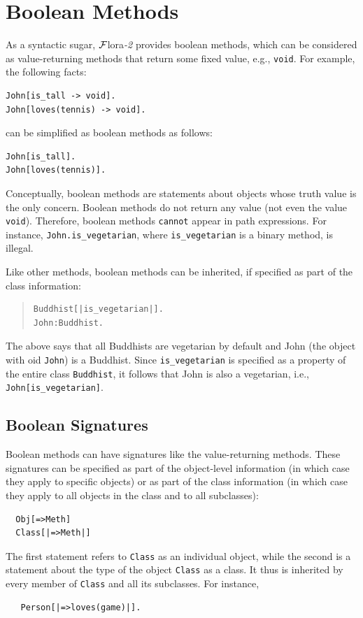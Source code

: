 \documentclass[11pt]{article}
\newcommand{\FLSYSTEM}{{\mbox{\sc ${\cal F}${lora}\rm\emph{-2}}}\xspace}
\begin{document}
\section{Boolean Methods}


As a syntactic sugar, \FLSYSTEM provides boolean methods, which can be
considered as value-returning methods that return some fixed value, e.g.,
{\tt void}. For example, the following facts:
\begin{verbatim}
John[is_tall -> void].
John[loves(tennis) -> void].
\end{verbatim}
can be simplified as boolean methods as follows:
\begin{verbatim}
John[is_tall].
John[loves(tennis)].
\end{verbatim}

Conceptually, boolean methods are statements about objects whose truth
value is the only concern. Boolean methods do not return any value (not
even the value {\tt void}). Therefore, boolean methods {\tt cannot} appear
in path expressions. For instance, \mbox{\tt John.is\_vegetarian}, where
{\tt is\_vegetarian} is a binary method, is illegal.

Like other methods, boolean methods can be inherited, if specified as part
of the class information:
\begin{quote}
\begin{verbatim}
Buddhist[|is_vegetarian|].
John:Buddhist.
\end{verbatim}
\end{quote}
The above says that all Buddhists are vegetarian by default
and John (the object with
oid {\tt John}) is a Buddhist. Since \verb|is_vegetarian| is specified as a
property of the entire class \texttt{Buddhist},
it follows that John is also a vegetarian, i.e.,
\verb|John[is_vegetarian]|.

\subsection{Boolean Signatures}

Boolean methods can have signatures like the value-returning methods.
These signatures can be specified as part of the object-level information
(in which case they apply to specific objects) or as part of the class
information (in which case they apply to all objects in the class and to
all subclasses):
\begin{verbatim}
  Obj[=>Meth]
  Class[|=>Meth|]
\end{verbatim}
The first statement refers to \texttt{Class} as an individual object, while
the second is a statement about the type of
the object \texttt{Class} as a class.
It thus is inherited by every member of \texttt{Class} and all its
subclasses. 
For instance,
\begin{verbatim}
   Person[|=>loves(game)|].
\end{verbatim}
\end{document}
